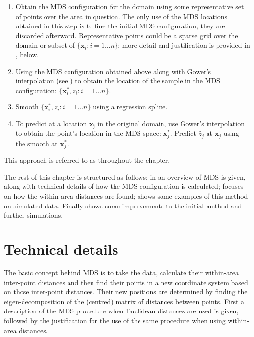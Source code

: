 \begin{enumerate}
\item Obtain the MDS configuration for the domain using some representative set of points over the area in question. The only use of the MDS locations obtained in this step is to fine the initial MDS configuration, they are discarded afterward. Representative points could be a sparse grid over the domain or subset of $\{\mathbf{x}_i : i=1\dots n\}$; more detail and justification is provided in , below.

\item Using the MDS configuration obtained above along with Gower's interpolation (see ) to obtain the location of the sample in the MDS configuration: $\{\mathbf{x}_i^*, z_i : i=1\dots n\}$.

\item Smooth $\{\mathbf{x}_i^*, z_i : i=1\dots n\}$ using a regression spline.

\item To predict at a location $\mathbf{x_j}$ in the original domain, use Gower's interpolation to obtain the point's location in the MDS space: $\mathbf{x}_j^*$. Predict $\hat{z}_j$ at $\mathbf{x}_j$ using the smooth at $\mathbf{x}_j^*$.
\end{enumerate}

This approach is referred to as \mdsap throughout the chapter.

The rest of this chapter is structured as follows: in  an overview of MDS is given, along with technical details of how the MDS configuration is calculated;  focuses on how the within-area distances are found;  shows some examples of this method on simulated data. Finally  shows some improvements to the initial method and further simulations.


\section{Technical details}
\label{MDStechdet}

The basic concept behind MDS is to take the data, calculate their within-area inter-point distances and then find their points in a new coordinate system based on those inter-point distances. Their new positions are determined by finding the eigen-decomposition of the (centred) matrix of distances between points. First a description of the MDS procedure when Euclidean distances are used is given, followed by the justification for the use of the same procedure when using within-area distances. 

